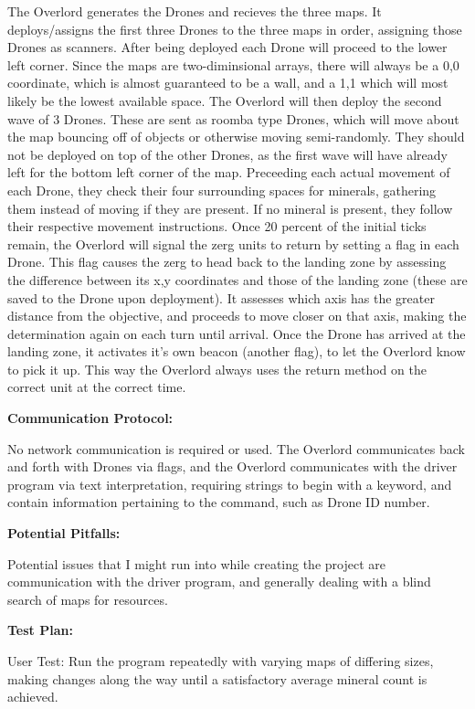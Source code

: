 \documentclass{article}
\begin{document}
    The Overlord generates the Drones and recieves the three maps. It deploys/assigns the first three Drones to the three maps in order, assigning those Drones as scanners. After being deployed each Drone will proceed to the lower left corner. Since the maps are two-diminsional arrays, there will always be a 0,0 coordinate, which is almost guaranteed to be a wall, and a 1,1 which will most likely be the lowest available space.
    The Overlord will then deploy the second wave of 3 Drones. These are sent as roomba type Drones, which will move about the map bouncing off of objects or otherwise moving semi-randomly. They should not be deployed on top of the other Drones, as the first wave will have already left for the bottom left corner of the map.
    Preceeding each actual movement of each Drone, they check their four surrounding spaces for minerals, gathering them instead of moving if they are present. If no mineral is present, they follow their respective movement instructions.
    Once 20 percent of the initial ticks remain, the Overlord will signal the zerg units to return by setting a flag in each Drone. This flag causes the zerg to head back to the landing zone by assessing the difference between its x,y coordinates and those of the landing zone (these are saved to the Drone upon deployment). It assesses which axis has the greater distance from the objective, and proceeds to move closer on that axis, making the determination again on each turn until arrival.
    Once the Drone has arrived at the landing zone, it activates it's own beacon (another flag), to let the Overlord know to pick it up. This way the Overlord always uses the return method on the correct unit at the correct time.
    \bigskip

    \textbf{Communication Protocol:}

    No network communication is required or used. The Overlord communicates back and forth with Drones via flags, and the Overlord communicates with the driver program via text interpretation, requiring strings to begin with a keyword, and contain information pertaining to the command, such as Drone ID number.
    \bigskip

    \textbf{Potential Pitfalls:}

    Potential issues that I might run into while creating the project are communication with the driver program, and generally dealing with a blind search of maps for resources.
    \bigskip

    \textbf{Test Plan:}

    User Test:
    Run the program repeatedly with varying maps of differing sizes, making changes along the way until a satisfactory average mineral count is achieved.
\end{document}
